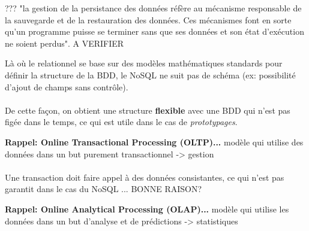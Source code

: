 \item{}
{???}
{"la gestion de la persistance des données réfère au mécanisme responsable de la sauvegarde et de la restauration des données. Ces mécanismes font en sorte qu'un programme puisse se terminer sans que ses données et son état d'exécution ne soient perdus". A VERIFIER}


\item{}
{\faux}
{Là où le relationnel se base sur des modèles mathématiques standards pour définir la structure de la BDD, le NoSQL ne suit pas de schéma (ex: possibilité d'ajout de champs sans contrôle). 
\paragraph{}
De cette façon, on obtient une structure \textbf{flexible} avec une BDD qui n'est pas figée dans le temps, ce qui est utile dans le cas de \textit{prototypages}.
}


\item{}
{\faux}
{\textbf{Rappel: Online Transactional Processing (OLTP)...} modèle qui utilise des données dans un but purement transactionnel -> gestion

\paragraph{}
Une transaction doit faire appel à des données consistantes, ce qui n'est pas garantit dans le cas du NoSQL ... BONNE RAISON?
}


\item{}
{\vrai}
{\textbf{Rappel: Online Analytical Processing (OLAP)...} modèle qui utilise les données dans un but d'analyse et de prédictions -> statistiques
}


